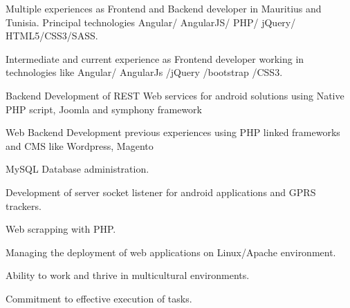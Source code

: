 \begin{cventries}
  \cventry
    {}
    {}
    {}
    {}
    {
      \begin{cvitems}
        \item {Multiple experiences as Frontend and Backend developer in Mauritius and Tunisia. Principal technologies Angular/ AngularJS/ PHP/ jQuery/ HTML5/CSS3/SASS.}
        \item {Intermediate and current experience as Frontend developer working in technologies like Angular/ AngularJs /jQuery /bootstrap /CSS3.}        
        \item {Backend Development of REST Web services for android solutions using Native PHP script, Joomla and symphony framework}
        \item {Web Backend Development previous experiences using PHP linked frameworks and CMS like Wordpress, Magento}
        \item {MySQL Database administration.}
        \item {Development of server socket listener for android applications and GPRS trackers.} \item {Web scrapping with PHP.}   
        \item {Managing the deployment of web applications on Linux/Apache environment.} 
        \item {Ability to work and thrive in multicultural environments.} 
        \item {Commitment to effective execution of tasks.}         
      \end{cvitems}
    }
\end{cventries}